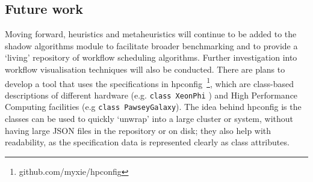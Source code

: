 \documentclass{article}
\begin{document}
\begin{multicols}{2}
\subsection*{Future work}
Moving forward, heuristics and metaheuristics will continue to be added to the shadow algorithms module to facilitate broader benchmarking and to provide a `living' repository of workflow scheduling algorithms. Further investigation into workflow visualisation techniques will also be conducted. There are plans to develop a tool that uses the specifications in
hpconfig~\footnote{github.com/myxie/hpconfig}, which are class-based
descriptions of different hardware (e.g. \texttt{class XeonPhi} ) and High Performance Computing
facilities (e.g \texttt{class PawseyGalaxy}). The idea behind hpconfig is
the classes can be used to quickly `unwrap' into a large cluster or system,
without having large JSON files in the repository or on disk; they also help
with readability, as the specification data is represented clearly as class
attributes.  


\end{multicols}
\end{document}

